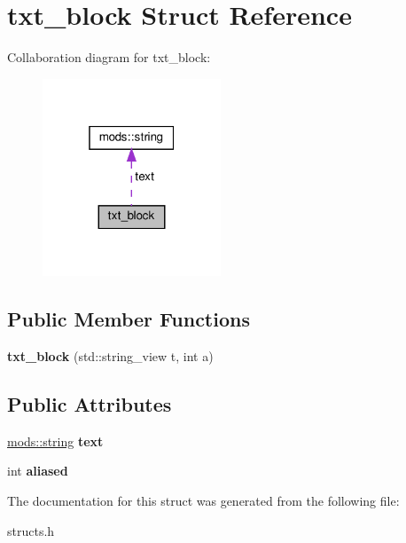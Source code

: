 \hypertarget{structtxt__block}{}\section{txt\+\_\+block Struct Reference}
\label{structtxt__block}


Collaboration diagram for txt\+\_\+block\+:
\nopagebreak
\begin{figure}[H]
\begin{center}
\leavevmode
\includegraphics[width=151pt]{structtxt__block__coll__graph}
\end{center}
\end{figure}
\subsection*{Public Member Functions}
\begin{DoxyCompactItemize}
\item 
\mbox{\label{structtxt__block_a1ebe94e0fd7c590ebc1f4651190bfcd2}} 
{\bfseries txt\+\_\+block} (std\+::string\+\_\+view t, int a)
\end{DoxyCompactItemize}
\subsection*{Public Attributes}
\begin{DoxyCompactItemize}
\item 
\mbox{\label{structtxt__block_ab73978f0e32d4ebaae4415aa4231059d}} 
\hyperlink{structmods_1_1string}{mods\+::string} {\bfseries text}
\item 
\mbox{\label{structtxt__block_a30621ea89d0dffa223c021419015b38a}} 
int {\bfseries aliased}
\end{DoxyCompactItemize}


The documentation for this struct was generated from the following file\+:\begin{DoxyCompactItemize}
\item 
structs.\+h\end{DoxyCompactItemize}
